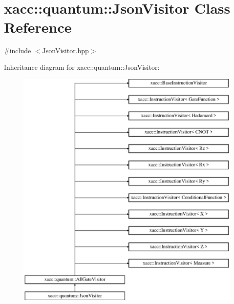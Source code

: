 \hypertarget{a00044}{}\section{xacc\+:\+:quantum\+:\+:Json\+Visitor Class Reference}
\label{a00044}


{\ttfamily \#include $<$Json\+Visitor.\+hpp$>$}

Inheritance diagram for xacc\+:\+:quantum\+:\+:Json\+Visitor\+:\begin{figure}[H]
\begin{center}
\leavevmode
\includegraphics[height=12.000000cm]{a00044}
\end{center}
\end{figure}
